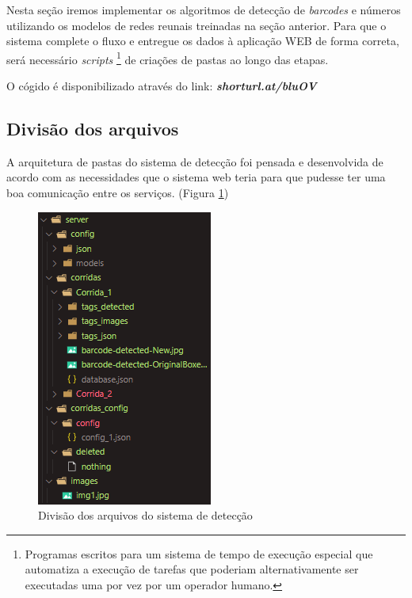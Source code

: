 Nesta seção iremos implementar os algoritmos de detecção de \textit{barcodes} e números utilizando os modelos de redes reunais treinadas na seção anterior. Para que o sistema complete o fluxo e entregue os dados à aplicação WEB de forma correta, será necessário \textit{scripts} \footnote{Programas escritos para um sistema de tempo de execução especial que automatiza a execução de tarefas que poderiam alternativamente ser executadas uma por vez por um operador humano.} de criações de pastas ao longo das etapas.

O cógido é disponibilizado através do link: \textbf{\textit{shorturl.at/bluOV}}

\subsection*{Divisão dos arquivos}

A arquitetura de pastas do sistema de detecção foi pensada e desenvolvida de acordo com as necessidades que o sistema web teria para que pudesse ter uma boa comunicação entre os serviços. (Figura \ref{fig:folderSystem})

\begin{figure}[H]
	\centering
	\includegraphics[width=0.4\linewidth]{figuras/MachineLearning/folderSystem.png}
	\caption{Divisão dos arquivos do sistema de detecção}
	\label{fig:folderSystem}
\end{figure}



